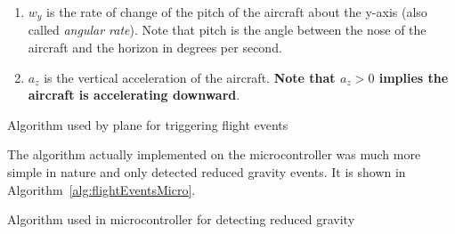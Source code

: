 \documentclass{article}
\begin{document}
\begin{enumerate}
	\item $w_y$ is the rate of change of the pitch of the aircraft about the y-axis (also called \textit{angular rate}). Note that pitch is the angle between the nose of the aircraft and the horizon in degrees per second.
	
	\item $a_z$ is the vertical acceleration of the aircraft. \textbf{Note that $a_z > 0$ implies the aircraft is accelerating downward}.
\end{enumerate}

\begin{algorithm}
	\caption{Algorithm used by plane for triggering flight events}
	\label{alg:flightEventsPlane}
	\begin{algorithmic}[1]
				\State {}
				
				\State {}
				
				\State {}
				
			\Else
				\State {}
				
			\EndIf
		\EndProcedure
	\end{algorithmic}
\end{algorithm}

The algorithm actually implemented on the microcontroller was much more simple in nature and only detected reduced gravity events. It is shown in Algorithm~\ref{alg:flightEventsMicro}.

\begin{algorithm}
	\caption{Algorithm used in microcontroller for detecting reduced gravity}
	\label{alg:flightEventsMicro}
	\begin{algorithmic}[1]
		\State {}
		
		\Else
		\State {}
		
		\EndIf
		\EndProcedure
	\end{algorithmic}
\end{algorithm}
\end{document}
